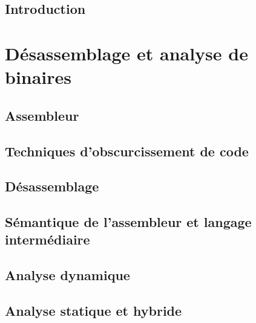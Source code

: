 \documentclass[12pt, oneside]{TUL/thesul}
\begin{document}

\DontWriteThisInToc   
\listoffigures


\mainmatter

\DontFrameThisInToc
\NumberThisInToc
\chapter{Introduction}


\part{Désassemblage et analyse de binaires}

\DontFrameThisInToc
\chapter{Assembleur}


\DontFrameThisInToc
\chapter{Techniques d'obscurcissement de code}


\DontFrameThisInToc
\chapter{Désassemblage}


\DontFrameThisInToc
\chapter{Sémantique de l'assembleur et langage intermédiaire}


\DontFrameThisInToc
\chapter{Analyse dynamique}


\DontFrameThisInToc
\chapter{Analyse statique et hybride}

\end{document}
